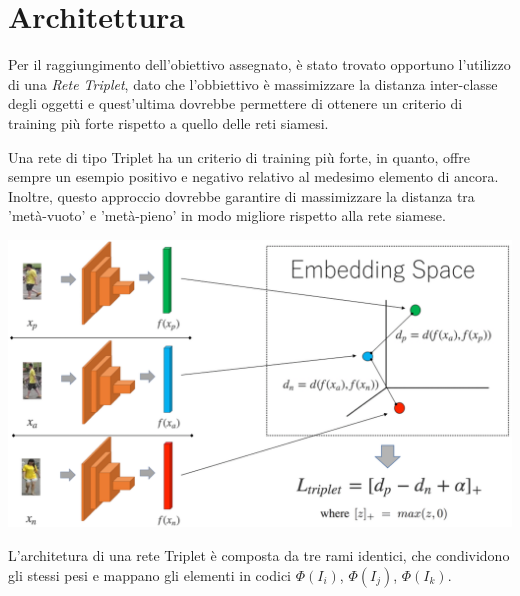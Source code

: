 \documentclass[11pt]{article}
\begin{document}
\pagebreak

\section{Architettura}

Per il raggiungimento dell'obiettivo assegnato, è stato trovato opportuno
l'utilizzo di una \textit{Rete Triplet}, dato che l'obbiettivo è
massimizzare la distanza inter-classe degli oggetti
e quest'ultima dovrebbe permettere di ottenere un criterio di training più forte rispetto a quello
delle reti siamesi.

Una rete di tipo Triplet ha un criterio di training più forte, in quanto, offre
sempre un esempio positivo e negativo relativo
al medesimo elemento di ancora. Inoltre, questo approccio dovrebbe garantire
di massimizzare la distanza tra 'metà-vuoto' e 'metà-pieno' in modo migliore rispetto alla rete siamese.

\begin{center}
    \begin{minipage}{0.6\linewidth}
    \includegraphics[width=\linewidth]{01.png}
    \end{minipage}
\end{center}

L'architetura di una rete Triplet è composta da tre rami identici, che condividono gli stessi pesi e mappano gli elementi in codici $\Phi(I_i)$, $\Phi(I_j)$, $\Phi(I_k)$.
\end{document}
